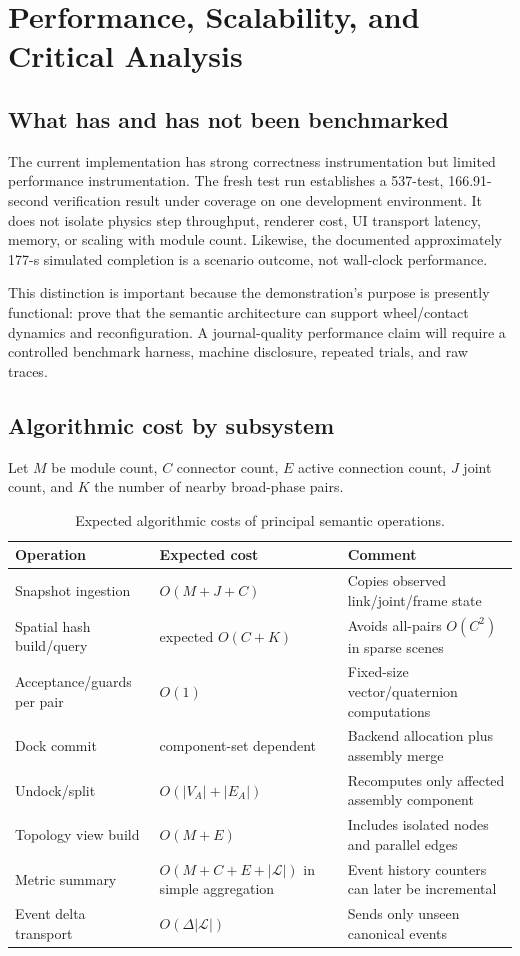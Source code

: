 \section{Performance, Scalability, and Critical Analysis}
\label{sec:analysis}

\subsection{What has and has not been benchmarked}

The current implementation has strong correctness instrumentation but limited
performance instrumentation. The fresh test run establishes a 537-test, 166.91-second
verification result under coverage on one development environment. It does not isolate
physics step throughput, renderer cost, UI transport latency, memory, or scaling with
module count. Likewise, the documented approximately 177-s simulated completion is a
scenario outcome, not wall-clock performance.

This distinction is important because the demonstration's purpose is presently
functional: prove that the semantic architecture can support wheel/contact dynamics and
reconfiguration. A journal-quality performance claim will require a controlled
benchmark harness, machine disclosure, repeated trials, and raw traces.

\subsection{Algorithmic cost by subsystem}

Let $M$ be module count, $C$ connector count, $E$ active connection count, $J$ joint
count, and $K$ the number of nearby broad-phase pairs.

\begin{table}[htbp]
\centering
\caption{Expected algorithmic costs of principal semantic operations.}
\label{tab:complexity}
\begin{tabularx}{\textwidth}{L{0.28\textwidth}L{0.22\textwidth}Y}
\toprule
Operation & Expected cost & Comment \\
\midrule
Snapshot ingestion & $O(M+J+C)$ & Copies observed link/joint/frame state \\
Spatial hash build/query & expected $O(C+K)$ & Avoids all-pairs $O(C^2)$ in sparse scenes \\
Acceptance/guards per pair & $O(1)$ & Fixed-size vector/quaternion computations \\
Dock commit & component-set dependent & Backend allocation plus assembly merge \\
Undock/split & $O(|V_A|+|E_A|)$ & Recomputes only affected assembly component \\
Topology view build & $O(M+E)$ & Includes isolated nodes and parallel edges \\
Metric summary & $O(M+C+E+|\mathcal L|)$ in simple aggregation & Event history counters can later be incremental \\
Event delta transport & $O(\Delta |\mathcal L|)$ & Sends only unseen canonical events \\
\bottomrule
\end{tabularx}
\end{table}

